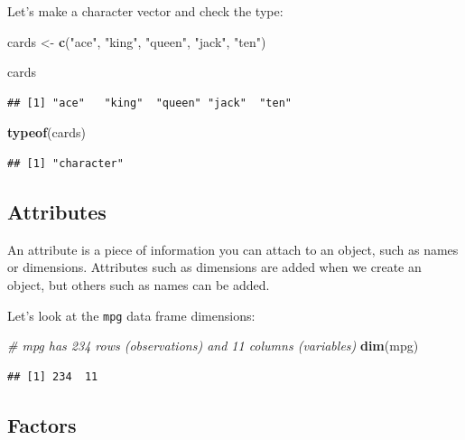 \documentclass[12pt,]{book}
\newenvironment{Shaded}{\begin{snugshade}}{\end{snugshade}}
\newcommand{\CommentTok}[1]{\textcolor[rgb]{0.56,0.35,0.01}{\textit{#1}}}
\newcommand{\KeywordTok}[1]{\textcolor[rgb]{0.13,0.29,0.53}{\textbf{#1}}}
\newcommand{\NormalTok}[1]{#1}
\newcommand{\StringTok}[1]{\textcolor[rgb]{0.31,0.60,0.02}{#1}}
\begin{document}
Let's make a character vector and check the type:

\begin{Shaded}
\begin{Highlighting}[]
\NormalTok{cards <-}\StringTok{ }\KeywordTok{c}\NormalTok{(}\StringTok{"ace"}\NormalTok{, }\StringTok{"king"}\NormalTok{, }\StringTok{"queen"}\NormalTok{, }\StringTok{"jack"}\NormalTok{, }\StringTok{"ten"}\NormalTok{)}

\NormalTok{cards}
\end{Highlighting}
\end{Shaded}

\begin{verbatim}
## [1] "ace"   "king"  "queen" "jack"  "ten"
\end{verbatim}

\begin{Shaded}
\begin{Highlighting}[]
\KeywordTok{typeof}\NormalTok{(cards)}
\end{Highlighting}
\end{Shaded}

\begin{verbatim}
## [1] "character"
\end{verbatim}

\hypertarget{attributes}{%
\subsection{Attributes}\label{attributes}}

An attribute is a piece of information you can attach to an object, such as
names or dimensions. Attributes such as dimensions are added when
we create an object, but others such as names can be added.

Let's look at the \texttt{mpg} data frame dimensions:

\begin{Shaded}
\begin{Highlighting}[]
\CommentTok{# mpg has 234 rows (observations) and 11 columns (variables)}
\KeywordTok{dim}\NormalTok{(mpg)}
\end{Highlighting}
\end{Shaded}

\begin{verbatim}
## [1] 234  11
\end{verbatim}

\hypertarget{factors}{%
\subsection{Factors}\label{factors}}
\end{document}
